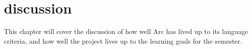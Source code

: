 \chapter{discussion}\label{cha:discussion}

This chapter will cover the discussion of how well Arc has lived up to its language criteria, and how well the project lives up to the learning goals for the semester.






